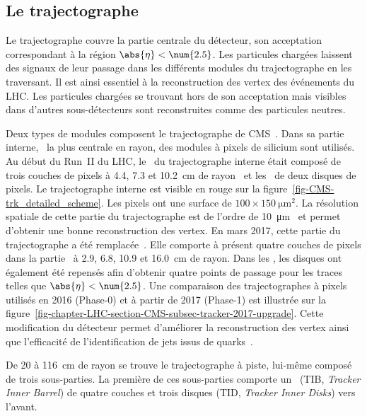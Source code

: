 \subsection{Le trajectographe}\label{chapter-LHC-section-CMS-subsec-tracker}
Le trajectographe couvre la partie centrale du détecteur, son acceptation correspondant à la région $\abs{\eta} < \num{2.5}$.
Les particules chargées laissent des signaux de leur passage dans les différents modules du trajectographe en les traversant.
Il est ainsi essentiel à la reconstruction des vertex des événements du LHC.
Les particules chargées se trouvant hors de son acceptation mais visibles dans d'autres sous-détecteurs sont reconstruites comme des particules neutres.
\par Deux types de modules composent le trajectographe de CMS~\cite{cms_paper,CERN-LHCC-98-006,CMS-TDR-11,CMS-TRK-11-001,CMS-TRK-17-001}.
Dans sa partie interne, \ie\ la plus centrale en rayon, des modules à pixels de silicium sont utilisés.
Au début du Run~II du LHC, le \CMSbarrel\ du trajectographe interne était composé de trois couches de pixels à \num{4.4}, \num{7.3} et \SI{10.2}{\centi\meter} de rayon~\cite{cms_paper} et les \CMSendcaps\ de deux disques de pixels.
Le trajectographe interne est visible en rouge sur la figure~\ref{fig-CMS-trk_detailed_scheme}.
Les pixels ont une surface de $\num{100}\times\SI{150}{\micro\meter^2}$.
La résolution spatiale de cette partie du trajectographe est de l'ordre de \SI{10}{\micro\meter}~\cite{cms_paper} et permet d'obtenir une bonne reconstruction des vertex.
En mars 2017, cette partie du trajectographe a été remplacée~\cite{CMS-TDR-11,cms_trk_upgrade_2017}.
Elle comporte à présent quatre couches de pixels dans la partie \CMSbarrel\ à \num{2.9}, \num{6.8}, \num{10.9} et \SI{16.0}{\centi\meter} de rayon.
Dans les \CMSendcaps, les disques ont également été repensés afin d'obtenir quatre points de passage pour les traces telles que $\abs{\eta}<\num{2.5}$.
Une comparaison des trajectographes à pixels utilisés en 2016 (Phase-0) et à partir de 2017 (Phase-1) est illustrée sur la figure~\ref{fig-chapter-LHC-section-CMS-subsec-tracker-2017-upgrade}.
Cette modification du détecteur permet d'améliorer la reconstruction des vertex ainsi que l'efficacité de l'identification de jets issus de quarks~\quarkb.
\par
De \num{20} à \SI{116}{\centi\meter} de rayon se trouve le trajectographe à piste, lui-même composé de trois sous-parties.
La première de ces sous-parties comporte un \CMSbarrel\ (TIB, \emph{Tracker Inner Barrel}) de quatre couches et trois disques (TID, \emph{Tracker Inner Disks}) vers l'avant.
